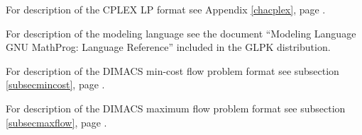 \noindent
For description of the CPLEX LP format see Appendix \ref{chacplex},
page \pageref{chacplex}.

\bigskip

\noindent
For description of the modeling language see the document ``Modeling
Language GNU MathProg: Language Reference'' included in the GLPK
distribution.

\bigskip

\noindent
For description of the DIMACS min-cost flow problem format see
subsection \ref{subsecmincost}, page \pageref{subsecmincost}.

\bigskip

\noindent
For description of the DIMACS maximum flow problem format see
subsection \ref{subsecmaxflow}, page \pageref{subsecmaxflow}.

